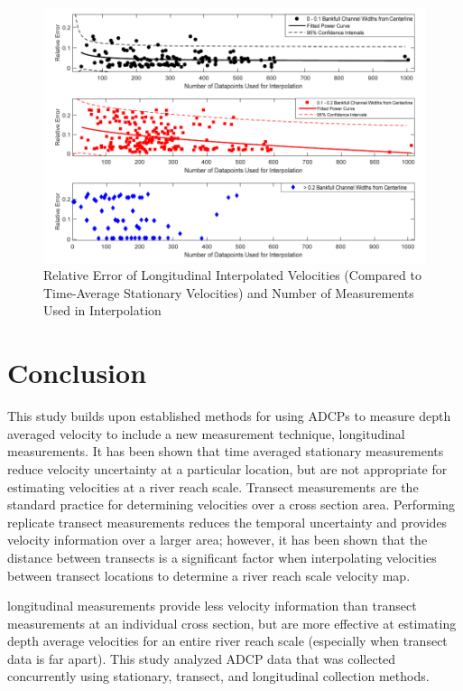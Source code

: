 \documentclass[Journal,letterpaper,BackFigs]{ascelike-new}
\begin{document}
\begin{figure}
\centering
\includegraphics[width=6in]{VelUncertainty.pdf}
\caption{Relative Error of Longitudinal Interpolated Velocities (Compared to Time-Average Stationary Velocities) and Number of Measurements Used in Interpolation}
\label{fig:VelUncertainty}
\end{figure}

\section{Conclusion}
This study builds upon established methods for using ADCPs to measure depth averaged velocity to include a new measurement technique, longitudinal measurements. It has been shown that time averaged stationary measurements reduce velocity uncertainty at a particular location, but are not appropriate for estimating velocities at a river reach scale. Transect measurements are the standard practice for determining velocities over a cross section area. Performing replicate transect measurements reduces the temporal uncertainty and provides velocity information over a larger area; however, it has been shown that the distance between transects is a significant factor when interpolating velocities between transect locations to determine a river reach scale velocity map.

longitudinal measurements provide less velocity information than transect measurements at an individual cross section, but are more effective at estimating depth average velocities for an entire river reach scale (especially when transect data is far apart). This study analyzed ADCP data that was collected concurrently using stationary, transect, and longitudinal collection methods. 
\end{document}

